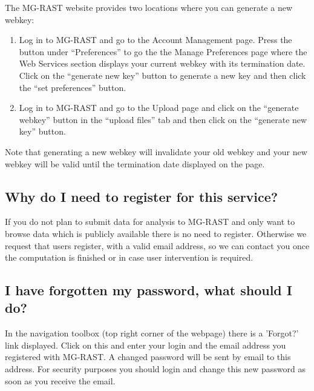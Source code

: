 \documentclass[12pt,fullpage]{report}
\begin{document}
The MG-RAST website provides two locations where you can generate a new webkey:

\begin{enumerate}
\item Log in to MG-RAST and go to the Account Management page. Press the button under ``Preferences'' to go the the Manage Preferences page where the Web Services section displays your current webkey with its termination date. Click on the ``generate new key'' button to generate a new key and then click the ``set preferences'' button.
\item Log in to MG-RAST and go to the Upload page and click on the ``generate webkey'' button in the ``upload files'' tab and then click on the ``generate new key'' button.
\end{enumerate}

\noindent
Note that generating a new webkey will invalidate your old webkey and your new webkey will be valid until the termination date displayed on the page.


\subsection*{Why do I need to register for this service?}
If you do not plan to submit data for analysis to MG-RAST and only want to browse data which is publicly available there is no need to register. Otherwise we request that users register, with a valid email address, so we can contact you once the computation is finished or in case user intervention is required.
\subsection*{I have forgotten my password, what should I do?}
In the navigation toolbox (top right corner of the webpage) there is a 'Forgot?' link displayed. Click on this and enter your login and the email address you registered with MG-RAST. A changed password will be sent by email to this address. For security purposes you should login and change this new password as soon as you receive the email.
\end{document}
